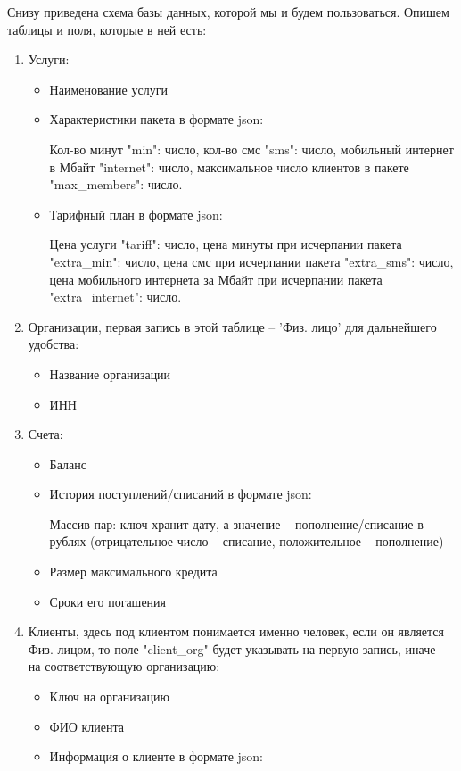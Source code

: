 \documentclass[oneside,senior,etd]{BYUPhysForDegree}
\begin{document}
Снизу приведена схема базы данных, которой мы и будем пользоваться. Опишем таблицы и поля, которые в ней есть:
\begin{enumerate}
    \item Услуги: \begin{itemize}
        \item Наименование услуги
        \item Характеристики пакета в формате json:
        
        Кол-во минут "min": число, кол-во смс "sms": число, мобильный интернет в Мбайт "internet": число, максимальное число клиентов в пакете "max\_members": число.
        \item Тарифный план в формате json:
        
        Цена услуги "tariff": число, цена минуты при исчерпании пакета "extra\_min": число, цена смс при исчерпании пакета "extra\_sms": число, цена мобильного интернета за Мбайт при исчерпании пакета  "extra\_internet": число.
    \end{itemize}
    \item Организации, первая запись в этой таблице -- 'Физ. лицо' для дальнейшего удобства: \begin{itemize}
        \item Название организации
        \item ИНН
    \end{itemize}

    \item Счета: \begin{itemize}
        \item Баланс
        \item История поступлений/списаний в формате json:
        
        Массив пар: ключ хранит дату, а значение -- пополнение/списание в рублях (отрицательное число -- списание, положительное -- пополнение)
        \item Размер максимального кредита
        \item Сроки его погашения
    \end{itemize}

    \item Клиенты, здесь под клиентом понимается именно человек, если он является Физ. лицом, то поле "client\_org" будет указывать на первую запись, иначе -- на соответствующую организацию: \begin{itemize}
        \item Ключ на организацию
        \item ФИО клиента
        \item Информация о клиенте в формате json:


\end{itemize}
\end{enumerate}
\end{document}
